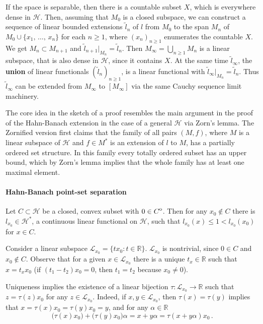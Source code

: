 \documentclass[a4paper]{article}
\newcommand{\Hcal}{\mathcal{H}}
\newcommand{\real}{\mathbb{R}}
\newcommand{\interior}[1]{%
  {\kern0pt#1}^{\mathrm{o}}%
}
\newcommand{\Lcal}{\mathcal{L}}
\begin{document}
If the space is separable, then there is a countable subset $X$, which is everywhere
dense in $\Hcal$. Then, assuming that $M_0$ is a closed subspace, we can construct
a sequence of linear bounded extensions $\tilde{l}_n$ of $l$ from $M_0$ to the span
$M_n$ of $M_0 \cup \{x_1,\,\ldots, \,x_n\}$ for each $n\geq 1$, where $(x_n)_{n\geq1}$
enumerates the countable $X$. We get $M_n\subset M_{n+1}$ and $\tilde{l}_{n+1}\big\vert_{M_n}
= \tilde{l}_{n}$. Then $M_\infty = \bigcup_{n\geq1} M_n$ is a linear subspace, that
is also dense in $\Hcal$, since it contains $X$. At the same time $\tilde{l}_\infty$,
the {\bf union} of linear functionals $(\tilde{l}_n)_{n\geq1}$, is a linear functional
with $\tilde{l}_\infty\big\vert_{M_n} = \tilde{l}_{n}$. Thus $\tilde{l}_\infty$ can
be extended from $M_\infty$ to $[M_\infty]$ via the same Cauchy sequence limit machinery.

The core idea in the sketch of a proof resembles the main argument in the proof
of the Hahn-Banach extension in the case of a general $\Hcal$ via Zorn's lemma. The
Zornified version first claims that the family of all pairs $(M, f)$, where $M$ is
a linear subspace of $\Hcal$ and $f\in M^*$ is an extension of $l$ to $M$, has a
partially ordered set structure. In this family every totally ordered subset has
an upper bound, which by Zorn's lemma implies that the whole family has at least
one maximal element.


\paragraph{Hahn-Banach point-set separation} %
\label{par:hahn_banach_point_set_separation}

Let $C\subset \Hcal$ be a closed, convex subset with $0\in \interior{C}$. Then for
any $x_0\notin C$ there is $l_{x_0} \in \Hcal^*$, a continuous linear functional on
$\Hcal$, such that $l_{x_0}(x) \leq 1 < l_{x_0}(x_0)$ for $x\in C$.

Consider a linear subspace $\Lcal_{x_0} = \{t x_0\colon t\in \real\}$. $\Lcal_{x_0}$
is nontrivial, since $0 \in C$ and $x_0\notin C$. Observe that for a given $x\in \Lcal_{x_0}$
there is a unique $t_x \in \real$ such that $x = t_x x_0$ (if $(t_1 - t_2) x_0 = 0$,
then $t_1 = t_2$ because $x_0 \neq 0$).

Uniqueness implies the existence of a linear bijection $\tau\colon \Lcal_{x_0} \to
\real$ such that $z = \tau(z) x_0$ for any $z\in \Lcal_{x_0}$. Indeed, if $x, y\in
\Lcal_{x_0}$, then $\tau(x) = \tau(y)$ implies that $x = \tau(x) x_0 = \tau(y) x_0
= y$, and for any $\alpha\in \real$
\begin{equation*}
  \bigl( \tau(x) x_0 \bigr) + \bigl( \tau(y) x_0 \bigr) \alpha
    = x + y \alpha
    = \tau(x + y \alpha) x_0
  \,.
\end{equation*}
\end{document}
